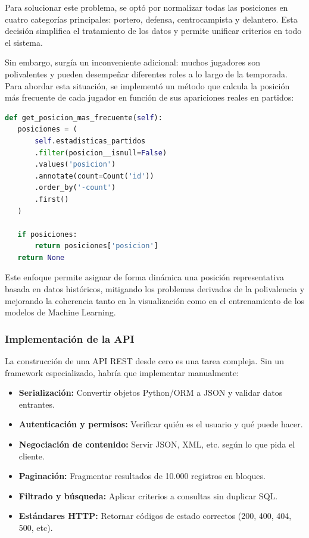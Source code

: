 Para solucionar este problema, se optó por normalizar todas las posiciones en cuatro categorías 
principales: portero, defensa, centrocampista y delantero. Esta decisión simplifica el tratamiento 
de los datos y permite unificar criterios en todo el sistema.

Sin embargo, surgía un inconveniente adicional: muchos jugadores son polivalentes
y pueden desempeñar diferentes roles a lo largo de la temporada. Para abordar
esta situación, se implementó un método que calcula la posición más frecuente de
cada jugador en función de sus apariciones reales en partidos:

\begin{lstlisting}[language=Python,caption={Función para calcular posición más frecuente de un jugador}]
def get_posicion_mas_frecuente(self):
   posiciones = (
       self.estadisticas_partidos
       .filter(posicion__isnull=False)
       .values('posicion')
       .annotate(count=Count('id'))
       .order_by('-count')
       .first()
   )
 
   if posiciones:
       return posiciones['posicion']
   return None
\end{lstlisting}

Este enfoque permite asignar de forma dinámica una posición representativa basada en datos
 históricos, mitigando los problemas derivados de la polivalencia y mejorando la coherencia
  tanto en la visualización como en el entrenamiento de los modelos de Machine Learning.

\subsubsection{Implementación de la API}

La construcción de una API REST desde cero es una tarea compleja. Sin un framework especializado,
 habría que implementar manualmente:

\begin{itemize}
\item \textbf{Serialización:} Convertir objetos Python/ORM a JSON y validar datos entrantes.
\item \textbf{Autenticación y permisos:} Verificar quién es el usuario y qué puede hacer.
\item \textbf{Negociación de contenido:} Servir JSON, XML, etc. según lo que pida el cliente.
\item \textbf{Paginación:} Fragmentar resultados de 10.000 registros en bloques.
\item \textbf{Filtrado y búsqueda:} Aplicar criterios a consultas sin duplicar SQL.
\item \textbf{Estándares HTTP:} Retornar códigos de estado correctos (200, 400, 404, 500, etc).
\end{itemize}

